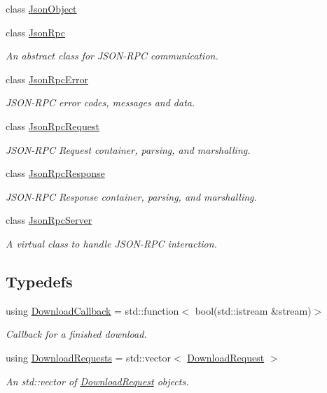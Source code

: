 \begin{DoxyCompactItemize}
class \hyperlink{classdg_1_1deepcore_1_1network_1_1_json_object}{Json\+Object}
\item 
class \hyperlink{classdg_1_1deepcore_1_1network_1_1_json_rpc}{Json\+Rpc}
\begin{DoxyCompactList}\small\item\em An abstract class for J\+S\+O\+N-\/\+R\+PC communication. \end{DoxyCompactList}\item 
class \hyperlink{classdg_1_1deepcore_1_1network_1_1_json_rpc_error}{Json\+Rpc\+Error}
\begin{DoxyCompactList}\small\item\em J\+S\+O\+N-\/\+R\+PC error codes, messages and data. \end{DoxyCompactList}\item 
class \hyperlink{classdg_1_1deepcore_1_1network_1_1_json_rpc_request}{Json\+Rpc\+Request}
\begin{DoxyCompactList}\small\item\em J\+S\+O\+N-\/\+R\+PC Request container, parsing, and marshalling. \end{DoxyCompactList}\item 
class \hyperlink{classdg_1_1deepcore_1_1network_1_1_json_rpc_response}{Json\+Rpc\+Response}
\begin{DoxyCompactList}\small\item\em J\+S\+O\+N-\/\+R\+PC Response container, parsing, and marshalling. \end{DoxyCompactList}\item 
class \hyperlink{classdg_1_1deepcore_1_1network_1_1_json_rpc_server}{Json\+Rpc\+Server}
\begin{DoxyCompactList}\small\item\em A virtual class to handle J\+S\+O\+N-\/\+R\+PC interaction. \end{DoxyCompactList}\end{DoxyCompactItemize}
\subsection*{Typedefs}
\begin{DoxyCompactItemize}
\item 
using \hyperlink{group___network_module_ga4d618c88e9b1e6e961f70621dc9aab41}{Download\+Callback} = std\+::function$<$ bool(std\+::istream \&stream)$>$
\begin{DoxyCompactList}\small\item\em Callback for a finished download. \end{DoxyCompactList}\item 
using \hyperlink{group___network_module_ga6a460317d5e2b04bbaa2bb5389ca2ce3}{Download\+Requests} = std\+::vector$<$ \hyperlink{structdg_1_1deepcore_1_1network_1_1_download_request}{Download\+Request} $>$
\begin{DoxyCompactList}\small\item\em An std\+::vector of \hyperlink{structdg_1_1deepcore_1_1network_1_1_download_request}{Download\+Request} objects. \end{DoxyCompactList}\end{DoxyCompactItemize}
